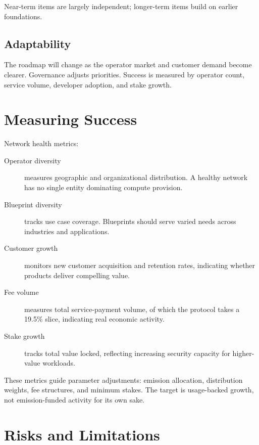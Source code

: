 \documentclass[11pt,a4paper]{article}
\begin{document}
Near-term items are largely independent; longer-term items build on earlier foundations.

\subsection{Adaptability}

The roadmap will change as the operator market and customer demand become clearer. Governance adjusts priorities. Success is measured by operator count, service volume, developer adoption, and stake growth.

\section{Measuring Success}

Network health metrics:

\begin{description}
    \item[Operator diversity] measures geographic and organizational distribution. A healthy network has no single entity dominating compute provision.
    \item[Blueprint diversity] tracks use case coverage. Blueprints should serve varied needs across industries and applications.
    \item[Customer growth] monitors new customer acquisition and retention rates, indicating whether products deliver compelling value.
    \item[Fee volume] measures total service-payment volume, of which the protocol takes a 19.5\% slice, indicating real economic activity.
    \item[Stake growth] tracks total value locked, reflecting increasing security capacity for higher-value workloads.
\end{description}

These metrics guide parameter adjustments: emission allocation, distribution weights, fee structures, and minimum stakes. The target is usage-backed growth, not emission-funded activity for its own sake.

\section{Risks and Limitations}
\end{document}
